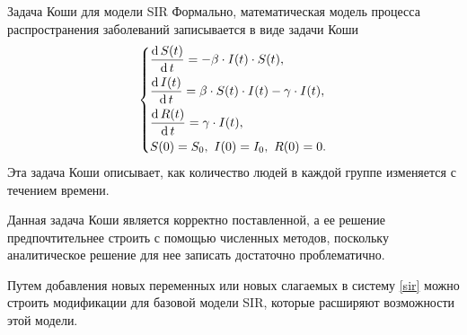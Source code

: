 \documentclass[notheorems]{beamer}
\renewcommand{\d}{\operatorname{d}}
\begin{document}
\begin{frame}
	{Задача Коши для модели SIR}
		Формально, математическая модель процесса распространения заболеваний записывается в виде задачи Коши
	\begin{equation}
		\label{sir}
		\begin{dcases}
			\dfrac {\d S(t)}{\d t} = - \beta \cdot I(t)\cdot S(t),\\
			\dfrac{\d I(t)}{\d t} =\beta \cdot S(t)\cdot I(t) - \gamma\cdot I(t),\\
			\dfrac{\d R(t)}{\d t} = \gamma\cdot I(t),\\
			S(0) = S_0,\ I(0) = I_0,\ R(0) = 0.
		\end{dcases}
	\end{equation}
	Эта задача Коши описывает, как количество людей в каждой группе изменяется с течением времени. 
	
	Данная задача Коши является корректно поставленной, а ее решение предпочтительнее строить с помощью численных методов, поскольку аналитическое решение для нее записать достаточно проблематично.
	
	Путем добавления новых переменных или новых слагаемых в систему \eqref{sir} можно строить модификации для базовой модели SIR, которые расширяют возможности этой модели.
\end{frame}
\end{document}
